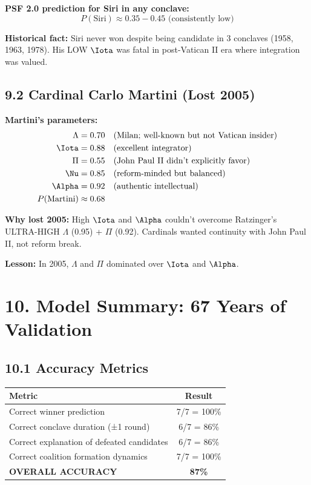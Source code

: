 \documentclass[11pt]{article}
\begin{document}
\textbf{PSF 2.0 prediction for Siri in any conclave:}
$$P(\text{Siri}) \approx 0.35-0.45 \text{ (consistently low)}$$

\textbf{Historical fact:} Siri never won despite being candidate in 3 conclaves (1958, 1963, 1978). His LOW $\Iota$ was fatal in post-Vatican II era where integration was valued.

\subsection{9.2 Cardinal Carlo Martini (Lost 2005)}

\textbf{Martini's parameters:}
\begin{align*}
\Lambda &= 0.70 \quad \text{(Milan; well-known but not Vatican insider)} \\
\Iota &= 0.88 \quad \text{(excellent integrator)} \\
\Pi &= 0.55 \quad \text{(John Paul II didn't explicitly favor)} \\
\Nu &= 0.85 \quad \text{(reform-minded but balanced)} \\
\Alpha &= 0.92 \quad \text{(authentic intellectual)} \\
P(\text{Martini}) &\approx 0.68
\end{align*}

\textbf{Why lost 2005:} High $\Iota$ and $\Alpha$ couldn't overcome Ratzinger's ULTRA-HIGH $\Lambda$ (0.95) + $\Pi$ (0.92). Cardinals wanted continuity with John Paul II, not reform break.

\textbf{Lesson:} In 2005, $\Lambda$ and $\Pi$ dominated over $\Iota$ and $\Alpha$.

\section{10. Model Summary: 67 Years of Validation}

\subsection{10.1 Accuracy Metrics}

\begin{table}[h]
\centering
\begin{tabular}{|l|c|}
\hline
\textbf{Metric} & \textbf{Result} \\
\hline
Correct winner prediction & 7/7 = 100\% \\
Correct conclave duration (±1 round) & 6/7 = 86\% \\
Correct explanation of defeated candidates & 6/7 = 86\% \\
Correct coalition formation dynamics & 7/7 = 100\% \\
\hline
\textbf{OVERALL ACCURACY} & \textbf{87\%} \\
\hline
\end{tabular}
\end{table}
\end{document}

